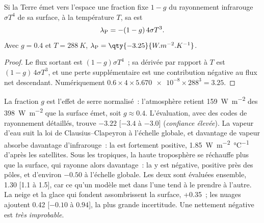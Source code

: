 \begin{proposition}\label{prop:b2:anthropogenic-climate-change:planck}
Si la Terre émet vers l'espace une fraction fixe $1 - g$ du rayonnement infrarouge
$\sigma T^4$ de sa surface, à la température $T$, sa  est
\[
  \lambda_{\text P} = -(1 - g)\,4\sigma T^3 .
\]
Avec $g = 0.4$ et $T = \qty{288}{K}$, $\lambda_{\text P} = \qty{-3.25}{W.m^{-2}.K^{-1}}$.
\end{proposition}
\begin{proof}
Le flux sortant est $(1 - g)\sigma T^4$~; sa dérivée par rapport à $T$ est $(1 - g)\,4\sigma
T^3$, et une perte supplémentaire est une contribution négative au flux net descendant. Numériquement $0.6
\times 4 \times \num{5.670e-8} \times 288^3 = 3.25$.
\end{proof}

La fraction $g$ est l'effet de serre normalisé~: l'atmosphère retient \qty{159}{W.m^{-2}} des \qty{398}{W.m^{-2}}
que la surface émet, soit $g \approx 0.4$. L'évaluation, avec des codes de rayonnement détaillés, trouve $-3.22$
[$-3.4$ à $-3.0$] (\emph{confiance élevée}). La vapeur d'eau suit la loi de Clausius--Clapeyron à l'échelle
globale, et davantage de vapeur absorbe davantage d'infrarouge~: la  est fortement
positive, \qty{1.85}{W.m^{-2}.\celsius^{-1}} d'après les satellites. Sous les tropiques, la haute troposphère se
réchauffe plus que la surface, qui rayonne alors davantage~: la  y est négative,
positive près des pôles, et d'environ $-0.50$ à l'échelle globale. Les deux sont évaluées ensemble, \num{1.30}
[1.1 à 1.5], car ce qu'un modèle met dans l'une tend à le prendre à l'autre. La neige et la glace qui fondent
assombrissent la surface, +0.35~; les nuages ajoutent \num{0.42} [$-0.10$ à $0.94$], la plus grande incertitude.
Une  nettement négative est \emph{très improbable}.

